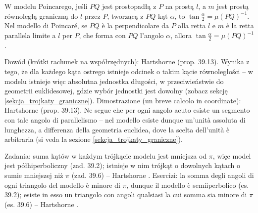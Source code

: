 \begin{theorem}
[wzór Bolyaia] %
[formula di Bolyai] %
	W modelu Poincarego, jeśli $PQ$ jest prostopadłą z $P$ na prostą $l$, a $m$ jest prostą równoległą graniczną do $l$ przez $P$, tworzącą z $PQ$ kąt $\alpha$, to $\tan\tfrac{\alpha}{2} = \mu(PQ)^{-1}$. %
	Nel modello di Poincaré, se $PQ$ è la perpendicolare da $P$ alla retta $l$ e $m$ è la retta parallela limite a $l$ per $P$, che forma con $PQ$ l'angolo $\alpha$, allora $\tan\tfrac{\alpha}{2} = \mu(PQ)^{-1}$. %
\end{theorem}

Dowód (krótki rachunek na współrzędnych): Hartshorne \cite[s. 364--365]{hartshorne_2000} (prop. 39.13). %
Wynika z tego, że dla każdego kąta ostrego istnieje odcinek o takim kącie równoległości -- w modelu istnieje więc absolutna jednostka długości, w przeciwieństwie do geometrii euklidesowej, gdzie wybór jednostki jest dowolny \cite[s. 365--366]{hartshorne_2000} (zobacz sekcję \ref{sekcja_trojkaty_graniczne}). %
Dimostrazione (un breve calcolo in coordinate): Hartshorne \cite[p. 364--365]{hartshorne_2000} (prop. 39.13). %
Ne segue che per ogni angolo acuto esiste un segmento con tale angolo di parallelismo -- nel modello esiste dunque un'unità assoluta di lunghezza, a differenza della geometria euclidea, dove la scelta dell'unità è arbitraria \cite[p. 365--366]{hartshorne_2000} (si veda la sezione \ref{sekcja_trojkaty_graniczne}). %

Zadania: suma kątów w każdym trójkącie modelu jest mniejsza od $\pi$, więc model jest półhiperboliczny (zad. 39.2); istnieje w nim trójkąt o dowolnych kątach o sumie mniejszej niż $\pi$ (zad. 39.6) -- Hartshorne \cite[s. 366]{hartshorne_2000}. %
Esercizi: la somma degli angoli di ogni triangolo del modello è minore di $\pi$, dunque il modello è semiiperbolico (es. 39.2); esiste in esso un triangolo con angoli qualsiasi la cui somma sia minore di $\pi$ (es. 39.6) -- Hartshorne \cite[p. 366]{hartshorne_2000}. %

